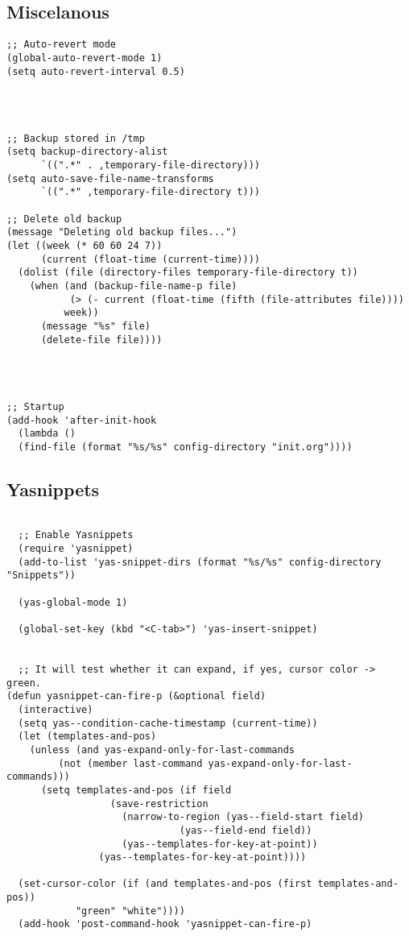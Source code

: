 \documentclass[11pt]{article}
\begin{document}
\subsection{Miscelanous}
\label{sec:org7e571a2}
\begin{verbatim}
;; Auto-revert mode
(global-auto-revert-mode 1)
(setq auto-revert-interval 0.5)




;; Backup stored in /tmp
(setq backup-directory-alist
      `((".*" . ,temporary-file-directory)))
(setq auto-save-file-name-transforms
      `((".*" ,temporary-file-directory t)))

;; Delete old backup
(message "Deleting old backup files...")
(let ((week (* 60 60 24 7))
      (current (float-time (current-time))))
  (dolist (file (directory-files temporary-file-directory t))
    (when (and (backup-file-name-p file)
	       (> (- current (float-time (fifth (file-attributes file))))
		  week))
      (message "%s" file)
      (delete-file file))))




;; Startup
(add-hook 'after-init-hook 
  (lambda () 
  (find-file (format "%s/%s" config-directory "init.org"))))

\end{verbatim}

\subsection{Yasnippets}
\label{sec:org035855f}

\begin{verbatim}

  ;; Enable Yasnippets
  (require 'yasnippet)
  (add-to-list 'yas-snippet-dirs (format "%s/%s" config-directory "Snippets"))

  (yas-global-mode 1)

  (global-set-key (kbd "<C-tab>") 'yas-insert-snippet)


  ;; It will test whether it can expand, if yes, cursor color -> green.
(defun yasnippet-can-fire-p (&optional field)
  (interactive)
  (setq yas--condition-cache-timestamp (current-time))
  (let (templates-and-pos)
    (unless (and yas-expand-only-for-last-commands
		 (not (member last-command yas-expand-only-for-last-commands)))
      (setq templates-and-pos (if field
				  (save-restriction
				    (narrow-to-region (yas--field-start field)
						      (yas--field-end field))
				    (yas--templates-for-key-at-point))
				(yas--templates-for-key-at-point))))

  (set-cursor-color (if (and templates-and-pos (first templates-and-pos)) 
			"green" "white"))))
  (add-hook 'post-command-hook 'yasnippet-can-fire-p)
\end{verbatim}
\end{document}

